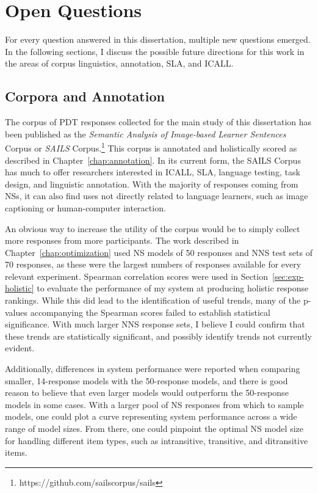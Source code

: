 \section{Open Questions}
\label{sec:conclusion-outlook}

For every question answered in this dissertation, multiple new questions emerged. In the following sections, I discuss the possible future directions for this work in the areas of corpus linguistics, annotation, SLA, and ICALL.

\subsection{Corpora and Annotation}
\label{sec:outlook-annotation}
The corpus of PDT responses collected for the main study of this dissertation has been published as the \textit{Semantic Analysis of Image-based Learner Sentences} Corpus or \textit{SAILS} Corpus.\footnote{https://github.com/sailscorpus/sails} This corpus is annotated and holistically scored as described in Chapter~\ref{chap:annotation}. In its current form, the SAILS Corpus has much to offer researchers interested in ICALL, SLA, language testing, task design, and linguistic annotation. With the majority of responses coming from NSs, it can also find uses not directly related to language learners, such as image captioning or human-computer interaction. 

An obvious way to increase the utility of the corpus would be to simply collect more responses from more participants. The work described in Chapter~\ref{chap:optimization} used NS models of 50 responses and NNS test sets of 70 responses, as these were the largest numbers of responses available for every relevant experiment. Spearman correlation scores were used in Section~\ref{sec:exp-holistic} to evaluate the performance of my system at producing holistic response rankings. While this did lead to the identification of useful trends, many of the p-values accompanying the Spearman scores failed to establish statistical significance. With much larger NNS response sets, I believe I could confirm that these trends are statistically significant, and possibly identify trends not currently evident.

Additionally, differences in system performance were reported when comparing smaller, 14-response models with the 50-response models, and there is good reason to believe that even larger models would outperform the 50-response models in some cases. With a larger pool of NS responses from which to sample models, one could plot a curve representing system performance across a wide range of model sizes. From there, one could pinpoint the optimal NS model size for handling different item types, such as intransitive, transitive, and ditransitive items.

